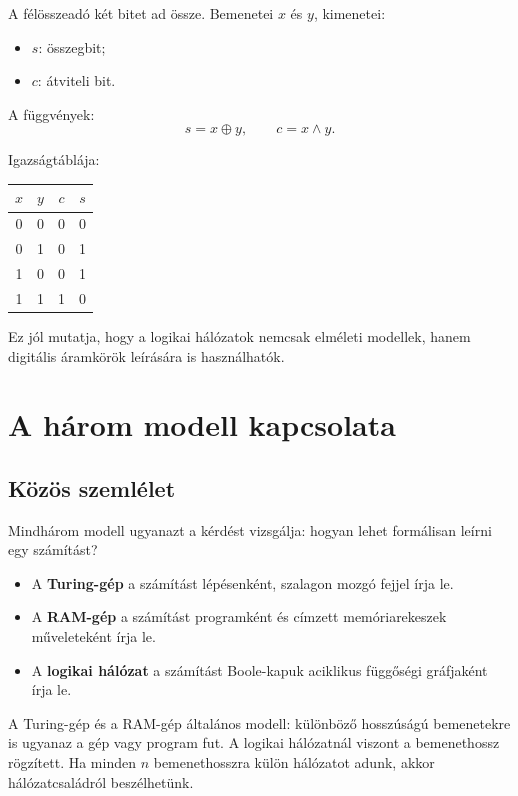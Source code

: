 A félösszeadó két bitet ad össze. Bemenetei $x$ és $y$, kimenetei:

\begin{itemize}
  \item $s$: összegbit;
  \item $c$: átviteli bit.
\end{itemize}

A függvények:
\[
  s=x\oplus y,
  \qquad
  c=x\wedge y.
\]

Igazságtáblája:

\begin{center}
\begin{tabular}{cccc}
\toprule
$x$ & $y$ & $c$ & $s$ \\
\midrule
0 & 0 & 0 & 0 \\
0 & 1 & 0 & 1 \\
1 & 0 & 0 & 1 \\
1 & 1 & 1 & 0 \\
\bottomrule
\end{tabular}
\end{center}

Ez jól mutatja, hogy a logikai hálózatok nemcsak elméleti modellek, hanem digitális áramkörök leírására is használhatók.

\section{A három modell kapcsolata}

\subsection{Közös szemlélet}

Mindhárom modell ugyanazt a kérdést vizsgálja: hogyan lehet formálisan leírni egy számítást?

\begin{itemize}
  \item A \textbf{Turing-gép} a számítást lépésenként, szalagon mozgó fejjel írja le.
  \item A \textbf{RAM-gép} a számítást programként és címzett memóriarekeszek műveleteként írja le.
  \item A \textbf{logikai hálózat} a számítást Boole-kapuk aciklikus függőségi gráfjaként írja le.
\end{itemize}

A Turing-gép és a RAM-gép általános modell: különböző hosszúságú bemenetekre is ugyanaz a gép vagy program fut. A logikai hálózatnál viszont a bemenethossz rögzített. Ha minden $n$ bemenethosszra külön hálózatot adunk, akkor hálózatcsaládról beszélhetünk.

